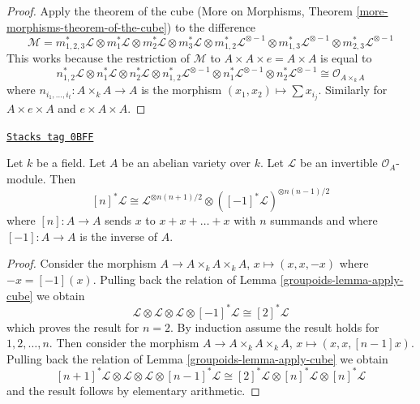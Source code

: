 \begin{proof}
Apply the theorem of the cube
(More on Morphisms, Theorem \ref{more-morphisms-theorem-of-the-cube})
to the difference
$$
\mathcal{M} =
m_{1, 2, 3}^*\mathcal{L} \otimes
m_1^*\mathcal{L} \otimes
m_2^*\mathcal{L} \otimes
m_3^*\mathcal{L} \otimes
m_{1, 2}^*\mathcal{L}^{\otimes -1} \otimes
m_{1, 3}^*\mathcal{L}^{\otimes -1} \otimes
m_{2, 3}^*\mathcal{L}^{\otimes -1}
$$
This works because the restriction of $\mathcal{M}$
to $A \times A \times e = A \times A$ is equal to
$$
n_{1, 2}^*\mathcal{L} \otimes
n_1^*\mathcal{L} \otimes
n_2^*\mathcal{L} \otimes
n_{1, 2}^*\mathcal{L}^{\otimes -1} \otimes
n_1^*\mathcal{L}^{\otimes -1} \otimes
n_2^*\mathcal{L}^{\otimes -1} \cong \mathcal{O}_{A \times_k A}
$$
where $n_{i_1, \ldots, i_t} : A \times_k A \to A$
is the morphism $(x_1, x_2) \mapsto \sum x_{i_j}$.
Similarly for $A \times e \times A$ and $e \times A \times A$.
\end{proof}

\begin{lemma}[Pullbacks by n]
\label{groupoids-lemma-pullbacks-by-n}
\href{https://stacks.math.columbia.edu/tag/0BFF}{\texttt{Stacks tag 0BFF}}

Let $k$ be a field. Let $A$ be an abelian variety over $k$.
Let $\mathcal{L}$ be an invertible $\mathcal{O}_A$-module.
Then
$$
[n]^*\mathcal{L} \cong
\mathcal{L}^{\otimes n(n + 1)/2} \otimes
([-1]^*\mathcal{L})^{\otimes n(n - 1)/2}
$$
where $[n] : A \to A$ sends $x$ to $x + x + \ldots + x$ with $n$ summands
and where $[-1] : A \to A$ is the inverse of $A$.
\end{lemma}

\begin{proof}

Consider the morphism $A \to A \times_k A \times_k A$,
$x \mapsto (x, x, -x)$ where $-x = [-1](x)$. Pulling back
the relation of Lemma \ref{groupoids-lemma-apply-cube} we obtain
$$
\mathcal{L} \otimes
\mathcal{L} \otimes
\mathcal{L} \otimes
[-1]^*\mathcal{L} \cong
[2]^*\mathcal{L}
$$
which proves the result for $n = 2$. By induction assume the result holds
for $1, 2, \ldots, n$. Then consider the morphism
$A \to A \times_k A \times_k A$, $x \mapsto (x, x, [n - 1]x)$.
Pulling back
the relation of Lemma \ref{groupoids-lemma-apply-cube} we obtain
$$
[n + 1]^*\mathcal{L} \otimes
\mathcal{L} \otimes
\mathcal{L} \otimes
[n - 1]^*\mathcal{L} \cong
[2]^*\mathcal{L} \otimes
[n]^*\mathcal{L} \otimes
[n]^*\mathcal{L}
$$
and the result follows by elementary arithmetic.
\end{proof}

